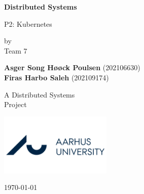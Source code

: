\newcommand{\norm}[1]{\left\lVert#1\right\rVert}     
\newcommand\course{Distributed Systems}        %
\newcommand\hwnumber{2}                                   %
\newcommand\Information{XXX/xxxxxxxx}                     %
\begin{titlepage}
    \begin{center}
        \vspace*{3cm}
            
        \Huge
        \textbf{\course{}}
            
        \vspace{1cm}
        \huge
        P\hwnumber : Kubernetes
            
        \vspace{1.5cm}
        \Large
        by\\
        Team 7
        
        \textbf{Asger Song Høøck Poulsen} (202106630) \\%
        \textbf{Firas Harbo Saleh} (202109174)%
        
            
        \vfill
        
        A \course{} \\Project
            
        \vspace{0.5cm}
            
        \includegraphics[width=0.4\textwidth]{img/aarhus-university.png}
        \\
        
        \Large
        
        \today
            
    \end{center}
\end{titlepage}